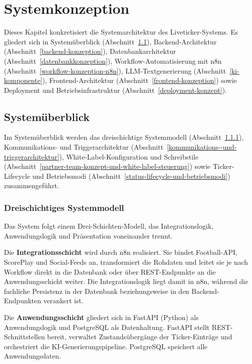 \chapter{Systemkonzeption}\label{systemkonzeption}

Dieses Kapitel konkretisiert die Systemarchitektur des Liveticker-Systems. Es gliedert sich in Systemüberblick (Abschnitt~\ref{überblick-und-schichtenmodell}), Backend-Architektur (Abschnitt~\ref{backend-konzeption}), Datenbankarchitektur (Abschnitt~\ref{datenbankkonzeption}), Workflow-Automatisierung mit n8n (Abschnitt~\ref{workflow-konzeption-n8n}), LLM-Textgenerierung (Abschnitt~\ref{ki-komponente}), Frontend-Architektur (Abschnitt~\ref{frontend-konzeption}) sowie Deployment und Betriebsinfrastruktur (Abschnitt~\ref{deployment-konzept}).



\section{Systemüberblick}\label{überblick-und-schichtenmodell}

Im Systemüberblick werden das dreischichtige Systemmodell (Abschnitt~\ref{schichtenmodell}), Kommunikations- und Triggerarchitektur (Abschnitt~\ref{kommunikations--und-triggerarchitektur}), White-Label-Konfiguration und Schreibstile (Abschnitt~\ref{partner-team-konzept-und-white-label-steuerung}) sowie Ticker-Lifecycle und Betriebsmodi (Abschnitt~\ref{status-lifecycle-und-betriebsmodi}) zusammengeführt.



\subsection{Dreischichtiges Systemmodell}\label{schichtenmodell}

Das System folgt einem Drei-Schichten-Modell, das Integrationslogik, Anwendungslogik und Präsentation voneinander trennt.

Die \textbf{Integrationsschicht} wird durch n8n realisiert. Sie bindet Football-API, ScorePlay und Social-Feeds an, transformiert die Rohdaten und leitet sie je nach Workflow direkt in die Datenbank oder über REST-Endpunkte an die Anwendungsschicht weiter. Die Integrationslogik liegt damit in n8n, während die fachliche Persistenz in der Datenbank beziehungsweise in den Backend-Endpunkten verankert ist.

Die \textbf{Anwendungsschicht} gliedert sich in FastAPI (Python) als Anwendungslogik und PostgreSQL als Datenhaltung. FastAPI stellt REST-Schnittstellen bereit, verwaltet Zustandsübergänge der Ticker-Einträge und orchestriert die KI-Generierungspipeline. PostgreSQL speichert alle Anwendungsdaten.

